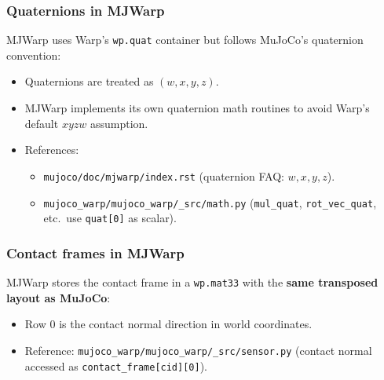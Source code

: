 \subsubsection{Quaternions in MJWarp}
MJWarp uses Warp's \texttt{wp.quat} container but follows MuJoCo's quaternion convention:
\begin{itemize}
  \item Quaternions are treated as \textbf{$(w,x,y,z)$}.
  \item MJWarp implements its own quaternion math routines to avoid Warp's default $xyzw$ assumption.
  \item References:
    \begin{itemize}
      \item \texttt{mujoco/doc/mjwarp/index.rst} (quaternion FAQ: $w,x,y,z$).
      \item \texttt{mujoco\_warp/mujoco\_warp/\_src/math.py} (\texttt{mul\_quat}, \texttt{rot\_vec\_quat}, etc.\ use \texttt{quat[0]} as scalar).
    \end{itemize}
\end{itemize}

\subsubsection{Contact frames in MJWarp}
MJWarp stores the contact frame in a \texttt{wp.mat33} with the \textbf{same transposed layout as MuJoCo}:
\begin{itemize}
  \item Row 0 is the contact normal direction in world coordinates.
  \item Reference: \texttt{mujoco\_warp/mujoco\_warp/\_src/sensor.py} (contact normal accessed as \texttt{contact\_frame[cid][0]}).
\end{itemize}

